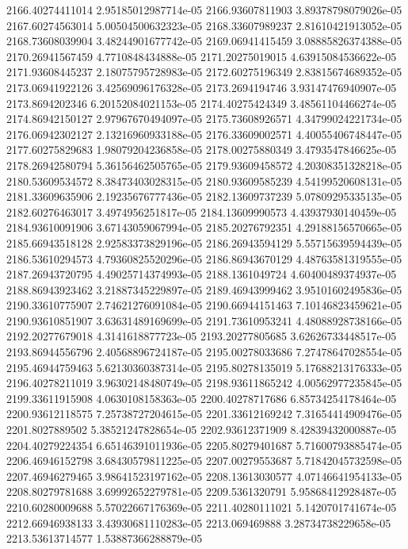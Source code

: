 {2166.40274411014 2.95185012987714e-05
2166.93607811903 3.89378798079026e-05
2167.60274563014 5.00504500632323e-05
2168.33607989237 2.81610421913052e-05
2168.73608039904 3.48244901677742e-05
2169.06941415459 3.08885826374388e-05
2170.26941567459 4.7710848434888e-05
2171.20275019015 4.63915084536622e-05
2171.93608445237 2.18075795728983e-05
2172.60275196349 2.83815674689352e-05
2173.06941922126 3.42569096176328e-05
2173.2694194746 3.93147476940907e-05
2173.8694202346 6.20152084021153e-05
2174.40275424349 3.48561104466274e-05
2174.86942150127 2.97967670494097e-05
2175.73608926571 4.34799024221734e-05
2176.06942302127 2.13216960933188e-05
2176.33609002571 4.40055406748447e-05
2177.60275829683 1.98079204236858e-05
2178.00275880349 3.4793547846625e-05
2178.26942580794 5.36156462505765e-05
2179.93609458572 4.20308351328218e-05
2180.53609534572 8.38473403028315e-05
2180.93609585239 4.54199520608131e-05
2181.33609635906 2.19235676777436e-05
2182.13609737239 5.07809295335135e-05
2182.60276463017 3.4974956251817e-05
2184.13609990573 4.43937930140459e-05
2184.93610091906 3.67143059067994e-05
2185.20276792351 4.29188156570665e-05
2185.66943518128 2.92583373829196e-05
2186.26943594129 5.55715639594439e-05
2186.53610294573 4.79360825520296e-05
2186.86943670129 4.48763581319555e-05
2187.26943720795 4.49025714374993e-05
2188.1361049724 4.60400489374937e-05
2188.86943923462 3.21887345229897e-05
2189.46943999462 3.95101602495836e-05
2190.33610775907 2.74621276091084e-05
2190.66944151463 7.10146823459621e-05
2190.93610851907 3.63631489169699e-05
2191.73610953241 4.48088928738166e-05
2192.20277679018 4.3141618877723e-05
2193.20277805685 3.62626733448517e-05
2193.86944556796 2.40568896724187e-05
2195.00278033686 7.27478647028554e-05
2195.46944759463 5.62130360387314e-05
2195.80278135019 5.17688213176333e-05
2196.40278211019 3.96302148480749e-05
2198.93611865242 4.00562977235845e-05
2199.33611915908 4.0630108158363e-05
2200.40278717686 6.85734254178464e-05
2200.93612118575 7.25738727204615e-05
2201.33612169242 7.31654414909476e-05
2201.8027889502 5.38521247828654e-05
2202.93612371909 8.42839432000887e-05
2204.40279224354 6.65146391011936e-05
2205.80279401687 5.71600793885474e-05
2206.46946152798 3.68430579811225e-05
2207.00279553687 5.71842045732598e-05
2207.46946279465 3.98641523197162e-05
2208.13613030577 4.07146641954133e-05
2208.80279781688 3.69992652279781e-05
2209.5361320791 5.95868412928487e-05
2210.60280009688 5.57022667176369e-05
2211.40280111021 5.1420701741674e-05
2212.66946938133 3.43930681110283e-05
2213.069469888 3.28734738229658e-05
2213.53613714577 1.53887366288879e-05
}
